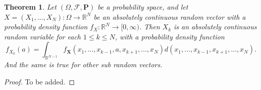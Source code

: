 \documentclass[11pt,a4paper]{article}
\theoremstyle{definition}
\theoremstyle{plain}
\newtheorem{theorem}{Theorem}[section]
\newcommand{\R}{\mathbb{R}}
\begin{document}
  \begin{theorem}
    Let $(\Omega, \mathcal F, \mathbf P)$ be a probability space, 
    and let $X = (X_1,\dots,X_N) \colon \Omega \to \R^N$ be an absolutely
    continuous random vector with a probability density function 
    $f_X \colon \R^N \to [0,\infty)$.
    Then $X_k$ is an absolutely continuous random variable for each
    $1 \le k \le N$, with a probability density function
    \[
      f_{X_{k}}(a) = 
      \int_{\R^{N-1}} 
      f_{\mathbf{X}}(x_{1},\dots,x_{k-1},a,x_{k+1},\dots,x_{N})
      d(x_{1},\ldots,x_{k-1},x_{k+1},\dots,x_{N}).
    \]
    And the same is true for other sub random vectors.
  \end{theorem}
  \begin{proof}
    To be added.
  \end{proof}
\end{document}
